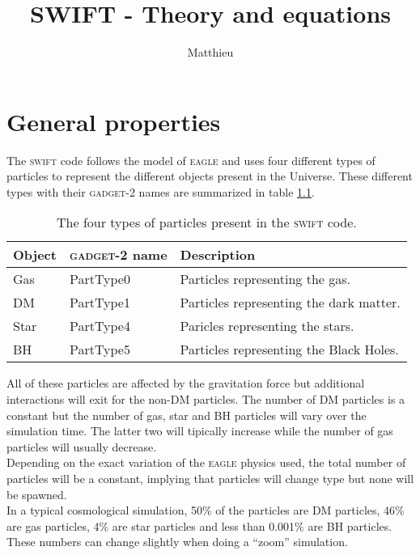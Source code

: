 \documentclass[a4paper,10pt]{report}
\title{SWIFT - Theory and equations}
\author{Matthieu}
\newcommand{\swift}{\textsc{swift }}
\newcommand{\eagle}{\textsc{eagle }}
\newcommand{\gadget}{\textsc{gadget-2 }}
\begin{document}
\maketitle





\chapter{General properties}
\label{chap:intro}

The \swift code follows the model of \eagle and uses four different types of particles to represent the different
objects present in the Universe. These different types with their \gadget names are summarized in table
\ref{tab:parttypes}.

\begin{table}[h]
\centering
\label{tab:parttypes}
\begin{tabular}{|l|l|l|}
\hline
\textbf{Object} & \textbf{\gadget name} & \textbf{Description} \\
\hline
Gas & PartType0 & Particles representing the gas.\\
DM & PartType1 & Particles representing the dark matter.\\
Star & PartType4 & Paricles representing the stars.\\
BH & PartType5 & Particles representing the Black Holes.\\
\hline
\end{tabular}
\caption{The four types of particles present in the \swift code.}
\end{table}

All of these particles are affected by the gravitation force but additional interactions will exit for the non-DM
particles. The number of DM particles is a constant but the number of gas, star and BH particles will vary
over the simulation time. The latter two will tipically increase while the number of gas particles will usually
decrease. \\
Depending on the exact variation of the \eagle physics used, the total number of particles will be a
constant, implying that particles will change type but none will be spawned. \\
In a typical cosmological simulation, 50\% of the particles are DM particles, 46\% are gas particles, 4\% are star
particles and less than 0.001\% are BH particles. These numbers can change slightly when doing a ``zoom'' simulation.\\
\end{document}
